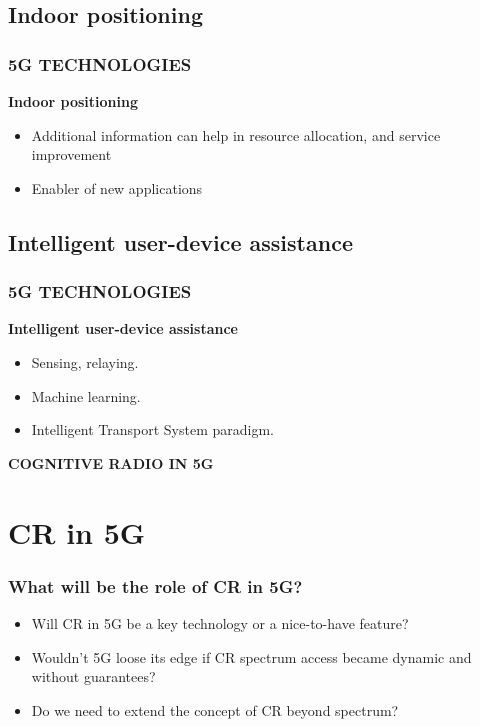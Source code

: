 \documentclass{beamer}
\begin{document}
\subsection{Indoor positioning}
\begin{frame}
\frametitle{5G TECHNOLOGIES}
\textbf{Indoor positioning}
\begin{itemize}
\item Additional information can help in resource allocation, and service improvement
\item Enabler of new applications
\end{itemize}
\end{frame}

\subsection{Intelligent user-device assistance}
\begin{frame}
\frametitle{5G TECHNOLOGIES}
\textbf{Intelligent user-device assistance}
\begin{itemize}
\item Sensing, relaying.
\item Machine learning.
\item Intelligent Transport System paradigm.

\end{itemize}
\end{frame}
\begin{frame}
\textbf{COGNITIVE RADIO IN 5G}
\end{frame}

\section{CR in 5G}
\begin{frame}
\frametitle{What will be the role of CR in 5G?}
\begin{itemize}
\item Will CR in 5G be a key technology or a nice-to-have feature?
\item Wouldn’t 5G loose its edge if CR spectrum access became dynamic and without guarantees?
\item Do we need to extend the concept of CR beyond spectrum?
\end{itemize}
\end{frame}
\end{document}
